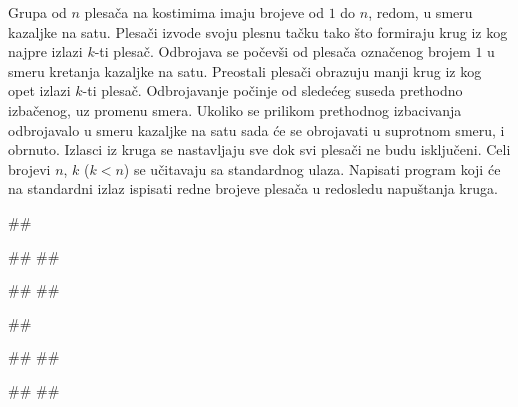 \begin{Exercise}[label=613]
Grupa od $n$ plesača na kostimima imaju brojeve od $1$ do $n$, redom, u smeru kazaljke na satu.
Plesači izvode svoju plesnu tačku tako što formiraju krug iz kog najpre izlazi $k$-ti plesač.
Odbrojava se počevši od plesača označenog brojem $1$ u smeru kretanja kazaljke na satu. 
Preostali plesači obrazuju manji krug iz kog opet izlazi $k$-ti plesač. Odbrojavanje počinje od
sledećeg suseda prethodno izbačenog, uz promenu smera. Ukoliko se prilikom prethodnog izbacivanja odbrojavalo 
u smeru kazaljke na satu sada će se obrojavati u suprotnom smeru, i obrnuto. Izlasci iz kruga se nastavljaju
sve dok svi plesači ne budu isključeni. 
Celi brojevi $n$, $k$ ($k < n$) se učitavaju sa standardnog ulaza. 
Napisati program koji će na standardni izlaz ispisati redne brojeve plesača u redosledu napuštanja kruga. 

\begin{minitest}
\begin{test}{1}
##

#\naslovUlaz#
##

#\naslovIzlaz# 
##
\end{test}
\end{minitest}
\begin{minitest}
\begin{test}{2}
##

#\naslovUlaz#
##

#\naslovIzlaz# 
## 
\end{test}
\end{minitest}
\end{Exercise}
